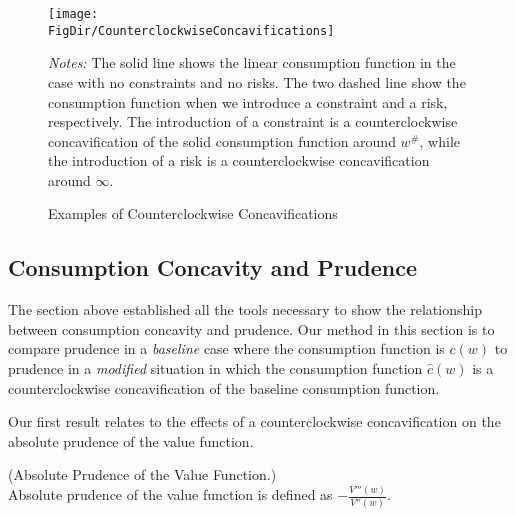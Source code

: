 \hypertarget{CounterclockwiseConcavifications}{}

\begin{figure}[ht]
	{\centering
	\texttt{[image: \\FigDir/CounterclockwiseConcavifications]}}
	\caption{Examples of Counterclockwise Concavifications}
	{\footnotesize \begin{singlespace} {\emph{Notes:} The solid line shows the linear consumption function in the case with no constraints and no risks. The two dashed line show the consumption function when we introduce a constraint and a risk, respectively. The introduction of a constraint is a counterclockwise concavification of the solid consumption function around $w^{\#}$, while the introduction of a risk is a counterclockwise concavification around $\infty$.}  \end{singlespace}}
	\label{fig:counterclockwise}
\end{figure}


\subsection{Consumption Concavity and Prudence}
The section above established all the tools necessary to show the relationship between consumption concavity and prudence. Our method in this section is to compare prudence in a \textit{baseline} case where the consumption function is $c(w)$ to prudence in a \textit{modified} situation in which the consumption function $\hat{c}(w)$ is a counterclockwise concavification of the baseline consumption function.

Our first result relates to the effects of a counterclockwise concavification on the absolute prudence of the value function.
\begin{defn}\label{defn:prudence}(Absolute Prudence of the Value Function.) \\
	Absolute prudence of the value function is defined as $-\frac{V'''(w)}{V''(w)}$.
\end{defn}

